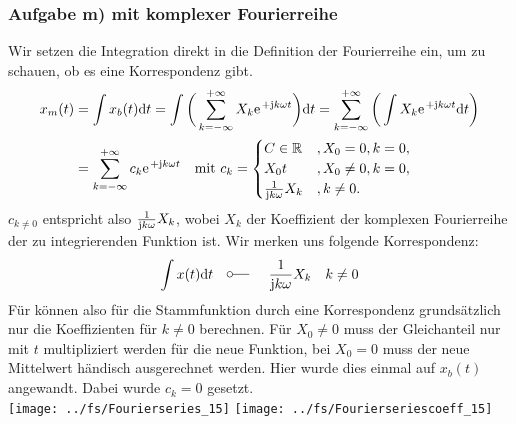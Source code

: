\documentclass[11pt,a4paper,DIV=12]{scrartcl}
\newcommand{\diff}{\mathrm{d}}
\begin{document}
\subsubsection*{Aufgabe m) mit komplexer Fourierreihe}
Wir setzen die Integration direkt in die Definition der Fourierreihe ein, um zu schauen, ob es eine Korrespondenz gibt.
\begin{align}
	x_m(t)&=\int x_b(t)\diff t=\int\bigg ( \sum_{k=-\infty}^{+\infty}X_k\e^{+\im k \omega t}\bigg )\diff t=\sum_{k=-\infty}^{+\infty}\bigg (\int X_k\e^{+\im k \omega t}\diff t\bigg )\nonumber \\
	&=\sum_{k=-\infty}^{+\infty}c_k\e^{+\im k \omega t}\quad\text{mit }c_k=\begin{cases}
		C\in\mathbb{R}&,X_0=0,k=0,\\
		X_0t&,X_0\neq 0,k=0,\\
		\frac{1}{\im k \omega}X_k&,k\neq 0.
	\end{cases}
\end{align}
$c_{k\neq 0}$ entspricht also $\frac{1}{\im k \omega }X_k$, wobei $X_k$ der Koeffizient der komplexen Fourierreihe der zu integrierenden Funktion ist. Wir merken uns folgende Korrespondenz:
\begin{align}
	\int x(t)\diff t\quad\fourier\quad \frac{1}{\im k \omega }X_k\quad k\neq 0
\end{align}
Für können also für die Stammfunktion durch eine Korrespondenz grundsätzlich nur die Koeffizienten für $k\neq 0$ berechnen. Für $X_0\neq 0$ muss der Gleichanteil nur mit $t$ multipliziert werden für die neue Funktion, bei $X_0=0$ muss der neue Mittelwert händisch ausgerechnet werden.
\newpage
Hier wurde dies einmal auf $x_b(t)$ angewandt. Dabei wurde $c_k=0$ gesetzt.\\
\texttt{[image: ../fs/Fourierseries\_15]}
\texttt{[image: ../fs/Fourierseriescoeff\_15]}
\newpage
\end{document}
